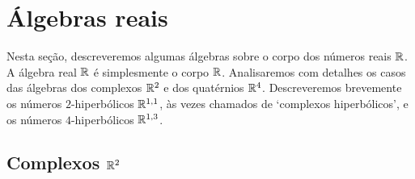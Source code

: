 \begin{comment}

\end{comment}




























\section{Álgebras reais}

Nesta seção, descreveremos algumas álgebras sobre o corpo dos números reais $\mathbb{R}$. A álgebra real $\mathbb{R}$ é simplesmente o corpo $\mathbb{R}$. Analisaremos com detalhes os casos das álgebras dos complexos $\mathbb{R}^2$ e dos quatérnios $\mathbb{R}^4$. Descreveremos brevemente os números $2$-hiperbólicos $\mathbb{R}^{1,1}$, às vezes chamados de `complexos hiperbólicos', e os números $4$-hiperbólicos $\mathbb{R}^{1,3}$.

\subsection{Complexos \texorpdfstring{$\mathbb{R}^2$}{}}

